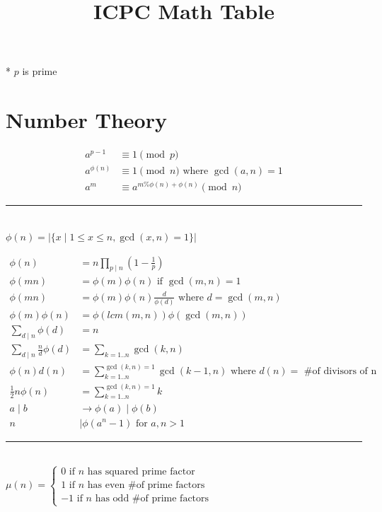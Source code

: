 \documentclass[10pt,landscape]{article}
\title{ICPC Math Table}
\date{}
\begin{document}
\maketitle

* $p$ is prime

\section{Number Theory}

\begin{align*}
	a^{p-1} &\equiv 1 \pmod{p} \\ %
	a^{\phi(n)} &\equiv 1 \pmod{n} \text{ where } \gcd(a,n) = 1 \\ %
	a^m &\equiv a^{m \% \phi(n) + \phi(n)} \pmod{n}
\end{align*}

\noindent\rule{\linewidth}{1pt}

 \\ $\phi(n) = |\{x \mid 1 \le x \le n, \gcd(x,n) = 1\}|$

\begin{align*}
	\phi(n) &= n \prod_{p \mid n}{(1 - \frac{1}{p})} \\
	\phi(mn) &= \phi(m) \phi(n) \text{ if } \gcd(m, n) = 1 \\
	\phi(mn) &= \phi(m) \phi(n) \frac{d}{\phi(d)} \text{ where } d = \gcd(m, n) \\
	\phi(m) \phi(n) &= \phi(lcm(m,n)) \phi(\gcd(m,n)) \\
	\sum_{d \mid n}{\phi(d)} &= n \\
	\sum_{d \mid n}{\frac{n}{d} \phi(d)} &= \sum_{k=1..n}{\gcd(k, n)} \\
	\phi(n) d(n) &= \sum_{k=1..n}^{\gcd(k,n)=1}{\gcd(k-1, n)} \text{ where } d(n) = \text{ \# of divisors of n }\\
	\frac{1}{2} n \phi(n) &= \sum_{k=1..n}^{\gcd(k,n)=1}{k} \\
	a \mid b &\rightarrow \phi(a) \mid \phi(b) \\
	n &\mid \phi(a^n - 1) \text{ for } a,n > 1
\end{align*}

\noindent\rule{\linewidth}{1pt}

 \\ $\mu(n) = \begin{cases} 0 \text{ if $n$ has squared prime factor} \\ 1 \text{ if $n$ has even \# of prime factors} \\ -1 \text{ if $n$ has odd \# of prime factors} \end{cases}$
\end{document}
